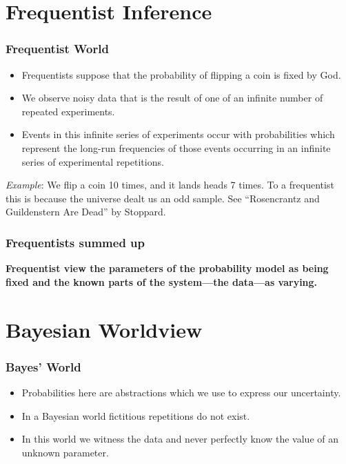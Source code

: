 \documentclass{beamer}
\begin{document}
\section{Frequentist Inference}

\begin{frame}
\frametitle{Frequentist World}

\begin{itemize}
	\item Frequentists suppose that the probability of flipping a coin is fixed by God.
	\item We observe noisy data that is the result of one of an infinite number of repeated experiments.
	\item Events in this infinite series of experiments occur with probabilities which represent the long-run frequencies of those events occurring in an infinite series of experimental repetitions.
 
\end{itemize}

\bigskip

\emph{Example}: We flip a coin 10 times, and it lands heads 7 times. To a frequentist this is because the universe dealt us an odd sample. See ``Rosencrantz and Guildenstern Are Dead'' by Stoppard.

\end{frame}


\begin{frame}
\frametitle{Frequentists summed up}

\textbf{Frequentist view the parameters of the probability model as
being fixed and the known parts of the system---the data---as varying.}

\end{frame}

\section{Bayesian Worldview}

\begin{frame}
\frametitle{Bayes' World}

\begin{itemize}
	\item Probabilities here are abstractions which we use to express our uncertainty.
	\item In a Bayesian world fictitious repetitions do not exist.
	\item In this world we witness the data and never perfectly know the value of an unknown parameter. 
\end{itemize}

\end{frame}
\end{document}
